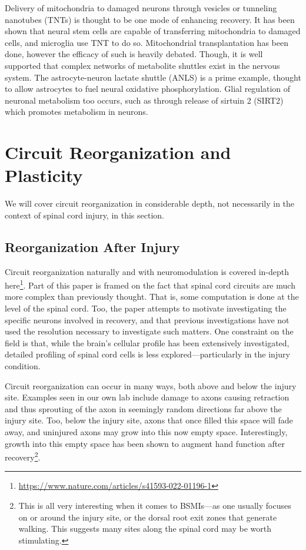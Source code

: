 Delivery of mitochondria to damaged neurons through vesicles or tunneling nanotubes (TNTs) is thought to be one mode of enhancing recovery. It has been shown that neural stem cells are capable of transferring mitochondria to damaged cells, and microglia use TNT to do so. Mitochondrial transplantation has been done, however the efficacy of such is heavily debated. Though, it is well supported that complex networks of metabolite shuttles exist in the nervous system. The astrocyte-neuron lactate shuttle (ANLS) is a prime example, thought to allow astrocytes to fuel neural oxidative phosphorylation. Glial regulation of neuronal metabolism too occurs, such as through release of sirtuin 2 (SIRT2) which promotes metabolism in neurons. 





\chapter{Circuit Reorganization and Plasticity}

\label{sec:CircuitReorganization}

We will cover circuit reorganization in considerable depth, not necessarily in the context of spinal cord injury, in this section. 

\section{Reorganization After Injury}


Circuit reorganization naturally and with neuromodulation is covered in-depth here\footnote{\url{https://www.nature.com/articles/s41593-022-01196-1}}. Part of this paper is framed on the fact that spinal cord circuits are much more complex than previously thought. That is, some computation is done at the level of the spinal cord. Too, the paper attempts to motivate investigating the specific neurons involved in recovery, and that previous investigations have not used the resolution necessary to investigate such matters. One constraint on the field is that, while the brain's cellular profile has been extensively investigated, detailed profiling of spinal cord cells is less explored---particularly in the injury condition.\newline

Circuit reorganization can occur in many ways, both above and below the injury site. Examples seen in our own lab include damage to axons causing retraction and thus sprouting of the axon in seemingly random directions far above the injury site. Too, below the injury site, axons that once filled this space will fade away, and uninjured axons may grow into this now empty space. Interestingly, growth into this empty space has been shown to augment hand function after recovery\footnote{This is all very interesting when it comes to BSMIs---as one usually focuses on or around the injury site, or the dorsal root exit zones that generate walking. This suggests many sites along the spinal cord may be worth stimulating.}.\newline

